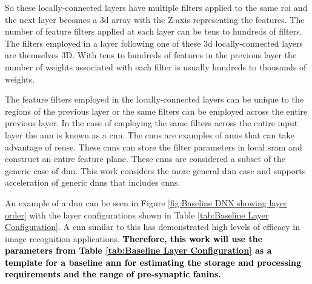 
So these locally-connected layers have multiple filters applied to the same \ac{roi} and the next layer becomes a \ac{3d} array with the Z-axis representing the features. 
The number of feature filters applied at each layer can be tens to hundreds of filters.
The filters employed in a layer following one of these \ac{3d} locally-connected layers are themselves 3D. With tens to hundreds of features in the previous layer the number of weights associated with each filter is usually hundreds to thousands of weights. 

The feature filters employed in the locally-connected layers can be unique to the regions of the previous layer or the same filters can be employed across the entire previous layer.
In the case of employing the same filters across the entire input layer the \ac{ann} is known as a \acf{cnn}. 
The \acp{cnn} are examples of \acp{ann} that can take advantage of reuse. %
These \acp{cnn} can store the filter parameters in local \ac{sram} and construct an entire feature plane. These \acp{cnn} are considered a subset of the generic case of \ac{dnn}.
This work considers the more general \ac{dnn} case and supports acceleration of generic \acp{dnn} that includes \acp{cnn}.

An example of a \ac{dnn} can be seen in Figure \ref{fig:Baseline DNN showing layer order} with the layer configurations shown in Table \ref{tab:Baseline Layer Configuration}. 
A \ac{cnn} similar to this has demonstrated high levels of efficacy in image recognition applications.
{\textbf{\textcolor{black}{Therefore, this work will use the parameters from Table \ref{tab:Baseline Layer Configuration} as a template for a baseline \ac{ann} for estimating the storage and processing requirements and the range of pre-synaptic fanins.}}}

